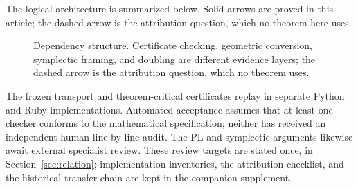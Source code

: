 \documentclass[11pt]{article}
\newcommand{\pione}{\pi_1}
\theoremstyle{definition}
\begin{document}
The logical architecture is summarized below.  Solid arrows are proved in
this article; the dashed arrow is the attribution question, which no
theorem here uses.

\begin{figure}[!htbp]
\centering
{}
\caption{Dependency structure.  Certificate checking, geometric conversion,
symplectic framing, and doubling are different evidence layers; the dashed
arrow is the attribution question, which no theorem uses.}
\label{fig:dependencies}
\end{figure}
\FloatBarrier

The frozen transport and theorem-critical certificates replay in separate
Python and Ruby implementations.  Automated acceptance assumes that at
least one checker conforms to the mathematical specification; neither has
received an independent human line-by-line audit.  The PL and symplectic
arguments likewise await external specialist review.  These review targets
are stated once, in Section~\ref{sec:relation}; implementation inventories,
the attribution checklist, and the historical transfer chain are kept in
the companion supplement.
\end{document}
